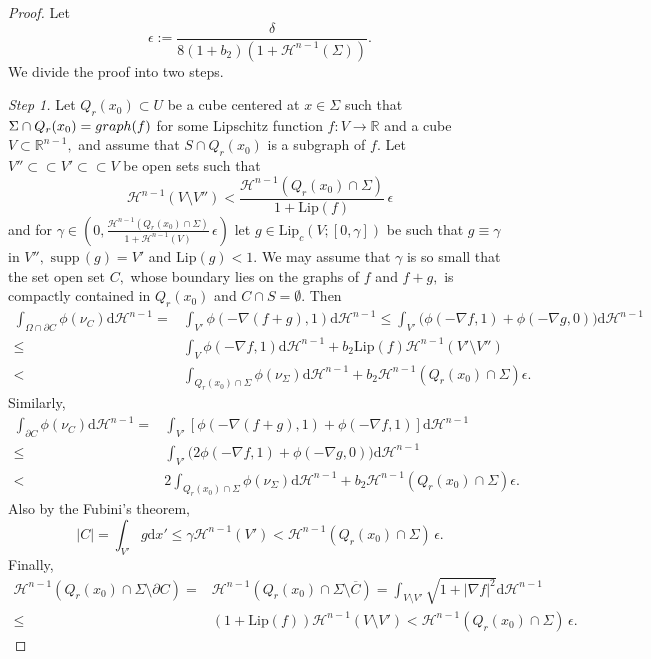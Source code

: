 \documentclass[reqno]{amsart}
\numberwithin{equation}{section}
\theoremstyle{plain}
\theoremstyle{definition}
\newcommand{\R}{\mathbb{R}}
\newcommand{\cH}{\mathcal{H}}
\newcommand{\p}{\partial}
\newcommand{\cl}[1]{\overline{#1}}
\newcommand{\bound}{b}
\renewcommand{\d}{\mathrm{d}}
\newcommand{\strictlyincluded}{\subset\subset}
\newcommand{\supp}{\mathrm{supp}\,}
\newcommand{\Lip}{\mathrm{Lip}}
\begin{document}
\begin{proof}
Let 
$$
\epsilon:= \frac{\delta}{8(1+\bound_2)(1 + \cH^{n-1}(\Sigma))}.
$$
We divide the proof into two steps.

{\it Step 1.} Let $Q_r(x_0)\subset U$ be a cube centered at $x\in\Sigma$ such that $\Sigma\cap Q_r(x_0) = {\rm graph}(f)$ for some Lipschitz function $f:V\to\R$ and a cube $V\subset \R^{n-1},$ and assume that $S\cap Q_r(x_0)$ is a subgraph of $f.$ 
Let $V''\strictlyincluded V'\strictlyincluded V$ be open sets such that 
$$
\cH^{n-1}(V\setminus V'') < \frac{\cH^{n-1}(Q_r(x_0)\cap\Sigma)}{1 + \Lip(f)}\,\epsilon
$$ 
and for $\gamma\in(0,\frac{\cH^{n-1}(Q_r(x_0)\cap\Sigma)}{1+\cH^{n-1}(V)}\,\epsilon)$ let $g\in \Lip_c(V;[0,\gamma])$ be such that $g\equiv \gamma$ in $V'',$ $\supp(g)=V'$ and $\Lip(g)<1.$ We may assume that $\gamma$ is so small that the set open set $C,$ whose boundary lies on the graphs of $f$ and $f+g,$ is compactly contained in $Q_r(x_0)$ and $C\cap S=\emptyset.$
Then 
\begin{align*}
\int_{\Omega\cap \p C}  \phi(\nu_C)\d\cH^{n-1} = & \int_{V'} \phi(-\nabla(f+g),1)\d\cH^{n-1} \le 
\int_{V'} \Big(\phi(-\nabla f,1) + \phi(-\nabla g,0)\Big)\d\cH^{n-1} \\
\le & \int_{V} \phi(-\nabla f,1)\d\cH^{n-1} + \bound_2\Lip(f)\cH^{n-1}(V'\setminus V'')\\
< & \int_{Q_r(x_0)\cap\Sigma}\phi(\nu_\Sigma)\d\cH^{n-1} + \bound_2\cH^{n-1}(Q_r(x_0)\cap\Sigma)\epsilon.
\end{align*}
Similarly, 
\begin{align*}
\int_{\p C}  \phi(\nu_C)\d\cH^{n-1} = & \int_{V'} [\phi(-\nabla(f+g),1) + \phi(-\nabla f,1)]\d\cH^{n-1} \\
\le &  
\int_{V'} \Big(2\phi(-\nabla f,1) + \phi(-\nabla g,0)\Big)\d\cH^{n-1} \\
< & 2\int_{Q_r(x_0)\cap\Sigma}\phi(\nu_\Sigma)\d\cH^{n-1} + \bound_2\cH^{n-1}(Q_r(x_0)\cap\Sigma)\epsilon.
\end{align*}
%
Also by the Fubini's theorem,
$$
|C| = \int_{V'} g \d x'\le \gamma \cH^{n-1}(V') < \cH^{n-1}(Q_r(x_0)\cap\Sigma)\,\epsilon.
$$
Finally, 
$$
\begin{aligned}
\cH^{n-1}(Q_r(x_0)\cap\Sigma\setminus \p C) = & \cH^{n-1}(Q_r(x_0)\cap\Sigma\setminus \cl{C}) 
=\int_{V\setminus V'}\sqrt{1+|\nabla f|^2}\d \cH^{n-1}\\
\le & (1+\Lip(f)) \cH^{n-1}(V\setminus V') < \cH^{n-1}(Q_r(x_0)\cap\Sigma)\,\epsilon.
\end{aligned}
$$


\end{proof}
\end{document}
